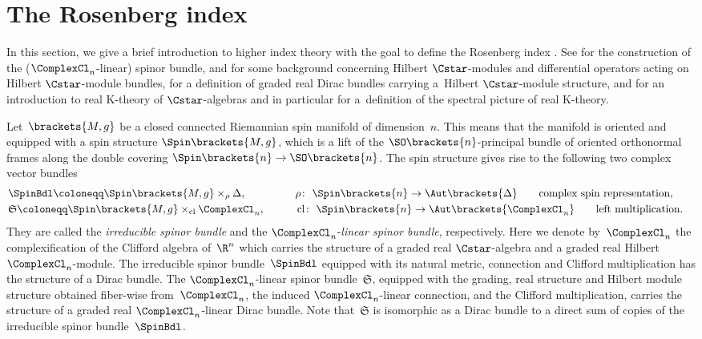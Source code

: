 \documentclass[pdftex]{sigma}
\numberwithin{equation}{section}
\newcommand{\ClSpinBdl}{\mathfrak{S}}
\begin{document}
\section{The Rosenberg index} \label{SectionRosenbergIndex}
%
In this section, we give a brief introduction to higher index theory with the goal to define the Rosenberg index \cite{Rosenberg1983}. See \cite{Lawson1989} for the construction of the ($\ComplexCl_n$-linear) spinor bundle, \cite{Lance1995} and \cite{Ebert2016} for some background concerning Hilbert $\Cstar$-modules and differential operators acting on Hilbert $\Cstar$-module bundles, \cite[Definition~2.1]{Tony2025} for a definition of graded real Dirac bundles carrying a~Hilbert $\Cstar$-module structure, and \cite{Roe} for an introduction to real K-theory of $\Cstar$-algebras and in particular for a~definition of the spectral picture of real K-theory.

Let~$\brackets{M,g}$ be a closed connected Riemannian spin manifold of dimension~$n$. This means that the manifold is oriented and equipped with a spin structure $\Spin\brackets{M,g}$, which is a lift of the $\SO\brackets{n}$-principal bundle of oriented orthonormal frames along the double covering $\Spin\brackets{n}\to \SO\brackets{n}$. The spin structure gives rise to the following two complex vector bundles
\begin{alignat*}{3}
& \SpinBdl\coloneqq \Spin\brackets{M,g}\times_{\rho} \Delta,\qquad&&
\rho\colon\ \Spin\brackets{n}\to \Aut\brackets{\Delta}\qquad
\text{complex spin representation},& \\
& \ClSpinBdl\coloneqq \Spin\brackets{M,g}\times_{\operatorname{cl}} \ComplexCl_n,\qquad&&
\operatorname{cl}\colon\ \Spin\brackets{n}\to \Aut\brackets{\ComplexCl_n}\qquad
\text{left multiplication}.
\end{alignat*}
They are called the \textit{irreducible spinor bundle} and the $\ComplexCl_n$-\textit{linear spinor bundle}, respectively. Here we denote by~$\ComplexCl_n$ the complexification of the Clifford algebra of~$\R^n$ which carries the structure of a graded real $\Cstar$-algebra and a graded real Hilbert $\ComplexCl_n$-module. The irreducible spinor bundle~$\SpinBdl$ equipped with its natural metric, connection and Clifford multiplication has the structure of a Dirac bundle. The $\ComplexCl_n$-linear spinor bundle~$\ClSpinBdl$, equipped with the grading, real structure and Hilbert module structure obtained fiber-wise from~$\ComplexCl_n$, the induced $\ComplexCl_n$-linear connection, and the Clifford multiplication, carries the structure of a graded real $\ComplexCl_n$-linear Dirac bundle. Note that~$\ClSpinBdl$ is isomorphic as a Dirac bundle to a direct sum of copies of the irreducible spinor bundle~$\SpinBdl$.
\end{document}
